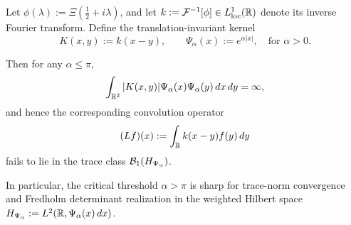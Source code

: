 \begin{proposition}
\label{prop:trace_class_sharpness}
Let \( \phi(\lambda) := \Xi\left( \tfrac{1}{2} + i\lambda \right) \), and let \( k := \mathcal{F}^{-1}[\phi] \in L^1_{\mathrm{loc}}(\mathbb{R}) \) denote its inverse Fourier transform. Define the translation-invariant kernel
\[
K(x, y) := k(x - y), \qquad \Psi_\alpha(x) := e^{\alpha |x|}, \quad \text{for } \alpha > 0.
\]

Then for any \( \alpha \le \pi \),
\[
\int_{\mathbb{R}^2} |K(x, y)| \Psi_\alpha(x) \Psi_\alpha(y) \, dx \, dy = \infty,
\]
and hence the corresponding convolution operator
\[
(Lf)(x) := \int_{\mathbb{R}} k(x - y) f(y) \, dy
\]
fails to lie in the trace class \( \mathcal{B}_1(H_{\Psi_\alpha}) \).

\medskip
\noindent
In particular, the critical threshold \( \alpha > \pi \) is sharp for trace-norm convergence and Fredholm determinant realization in the weighted Hilbert space \( H_{\Psi_\alpha} := L^2(\mathbb{R}, \Psi_\alpha(x)\, dx) \).
\end{proposition}

